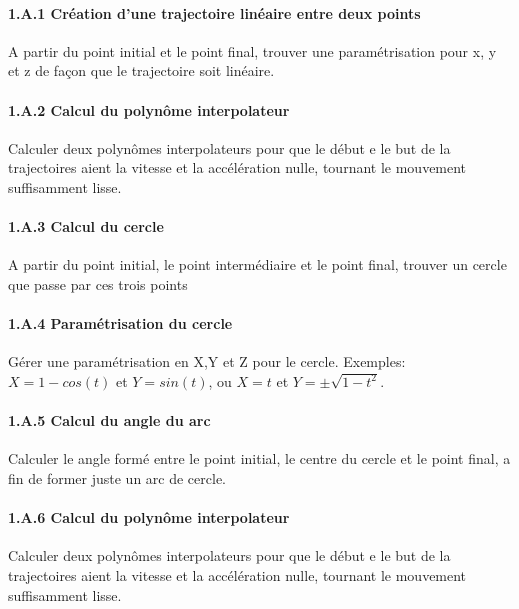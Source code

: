 
\paragraph{1.A.1 Création d'une trajectoire linéaire entre deux points}
A partir du point initial et le point final, trouver une paramétrisation pour x, y et z de façon que le trajectoire soit linéaire.                                                 
\paragraph{1.A.2 Calcul du polynôme interpolateur} 
Calculer deux polynômes interpolateurs pour que le début e le but de la trajectoires aient la vitesse et la accélération nulle, tournant le mouvement suffisamment lisse. 

\paragraph{1.A.3 Calcul du cercle}
A partir du point initial, le point intermédiaire et le point final, trouver un cercle que passe par ces trois points

\paragraph{1.A.4 Paramétrisation du cercle}
Gérer une paramétrisation en X,Y et Z pour le cercle.  Exemples: $ X=1-cos(t) $ et $ Y=sin(t) $, ou $ X=t $ et $ Y=\pm \sqrt{1-t^2}$.

\paragraph{1.A.5 Calcul du angle du arc}
Calculer le angle formé entre le point initial, le centre du cercle et le point final, a fin de former juste un arc de cercle.

\paragraph{1.A.6 Calcul du polynôme interpolateur}
Calculer deux polynômes interpolateurs pour que le début e le but de la trajectoires aient la vitesse et la accélération nulle, tournant le mouvement suffisamment lisse. 


